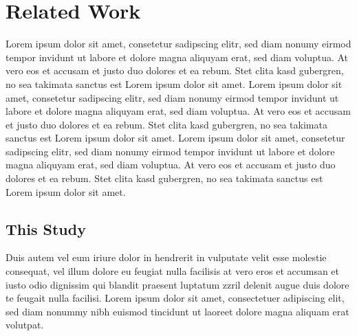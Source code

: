 \chapter{Related Work}
Lorem ipsum dolor sit amet, consetetur sadipscing elitr,  sed diam nonumy eirmod
tempor invidunt ut labore et dolore magna aliquyam erat, sed diam voluptua. At
vero eos et accusam et justo duo dolores et ea rebum. Stet clita kasd gubergren,
no sea takimata sanctus est Lorem ipsum dolor sit amet. Lorem ipsum dolor sit
amet, consetetur sadipscing elitr,  sed diam nonumy eirmod tempor invidunt ut
labore et dolore magna aliquyam erat, sed diam voluptua. At vero eos et accusam
et justo duo dolores et ea rebum. Stet clita kasd gubergren, no sea takimata
sanctus est Lorem ipsum dolor sit amet. Lorem ipsum dolor sit amet, consetetur
sadipscing elitr,  sed diam nonumy eirmod tempor invidunt ut labore et dolore
magna aliquyam erat, sed diam voluptua. At vero eos et accusam et justo duo
dolores et ea rebum. Stet clita kasd gubergren, no sea takimata sanctus est
Lorem ipsum dolor sit amet.

\section{This Study}
Duis autem vel eum iriure dolor in hendrerit in vulputate velit esse molestie
consequat, vel illum dolore eu feugiat nulla facilisis at vero eros et accumsan
et iusto odio dignissim qui blandit praesent luptatum zzril delenit augue duis
dolore te feugait nulla facilisi. Lorem ipsum dolor sit amet, consectetuer
adipiscing elit, sed diam nonummy nibh euismod tincidunt ut laoreet dolore
magna aliquam erat volutpat.

